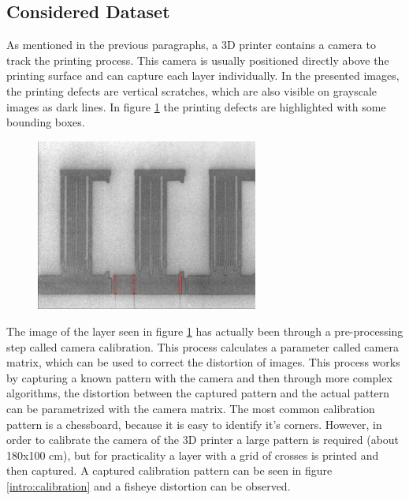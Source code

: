 \subsection{Considered Dataset}
As mentioned in the previous paragraphs, a 3D printer contains a camera to track the printing process. This camera is usually positioned directly above the printing surface and can capture each layer individually. In the presented images, the printing defects are vertical scratches, which are also visible on grayscale images as dark lines. In figure \ref{fig:layer_00325_marked_cropped} the printing defects are highlighted with some bounding boxes. \\

\begin{figure}[!h]
  \includegraphics[width=0.65\textwidth]{images/layer_00325_marked_cropped}
  \centering
  \caption{}
  \label{fig:layer_00325_marked_cropped}
\end{figure}

The image of the layer seen in figure \ref{fig:layer_00325_marked_cropped} has actually been through a pre-processing step called camera calibration. This process calculates a parameter called camera matrix, which can be used to correct the distortion of images. This process works by capturing a known pattern with the camera and then through more complex algorithms, the distortion between the captured pattern and the actual pattern can be parametrized with the camera matrix. The most common calibration pattern is a chessboard, because it is easy to identify it's corners. However, in order to calibrate the camera of the 3D printer a large pattern is required (about 180x100 cm), but for practicality a layer with a grid of crosses is printed and then captured. A captured calibration pattern can be seen in figure \ref{intro:calibration} and a fisheye distortion can be observed. \\

